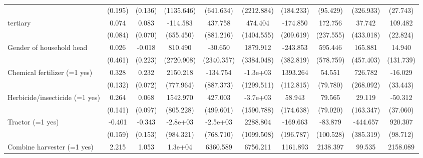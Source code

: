 {\begin{tabular}{l*{9}{c}}
                    &(0.195)         &(0.136)         &(1135.646)         &(641.634)         &(2212.884)         &(184.233)         &(95.429)         &(326.933)         &(27.743)         \\
tertiary            &0.074         &0.083         &-114.583         &437.758         &474.404         &-174.850         &172.756         &37.742         &109.482\sym{***}\\
                    &(0.084)         &(0.070)         &(655.450)         &(881.216)         &(1404.555)         &(209.619)         &(237.555)         &(433.018)         &(22.824)         \\
Gender of household head&0.026         &-0.018         &810.490         &-30.650         &1879.912         &-243.853         &595.446         &165.881         &14.940         \\
                    &(0.461)         &(0.223)         &(2720.908)         &(2340.357)         &(3384.048)         &(382.819)         &(578.759)         &(457.403)         &(131.739)         \\
Chemical fertilizer (=1 yes)&0.328\sym{**} &0.232\sym{**} &2150.218\sym{**} &-134.754         &-1.3e+03         &1393.264\sym{***}&54.551         &726.782\sym{**} &-16.029         \\
                    &(0.132)         &(0.072)         &(777.964)         &(887.373)         &(1299.511)         &(112.815)         &(79.780)         &(268.092)         &(33.443)         \\
Herbicide/insecticide (=1 yes)&0.264         &0.068         &1542.970\sym{*}  &427.003         &-3.7e+03\sym{*}  &58.943         &79.565         &29.119         &-50.312         \\
                    &(0.141)         &(0.097)         &(805.228)         &(499.601)         &(1590.788)         &(174.638)         &(79.020)         &(163.347)         &(37.060)         \\
Tractor (=1 yes)    &-0.401\sym{**} &-0.343\sym{*}  &-2.8e+03\sym{**} &-2.5e+03\sym{**} &2288.804\sym{*}  &-169.663         &-83.879         &-444.657         &920.307\sym{***}\\
                    &(0.159)         &(0.153)         &(984.321)         &(768.710)         &(1099.508)         &(196.787)         &(100.528)         &(385.319)         &(98.712)         \\
Combine harvester (=1 yes)&2.215\sym{***}&1.053\sym{***}&1.3e+04\sym{***}&6360.589\sym{***}&6756.211\sym{*}  &1161.893\sym{***}&2138.397         &99.535         &2158.089\sym{***}\\

\end{tabular}}

